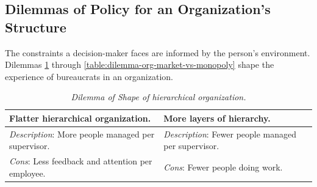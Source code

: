 
\subsection*{Dilemmas of Policy for an Organization's Structure\label{sec:org-dilemma}}


The constraints a decision-maker faces are informed by the person's environment. Dilemmas \ref{table:dilemma-org-people-per-supervisor} through \ref{table:dilemma-org-market-vs-monopoly} shape the experience of bureaucrats in an organization.

\begin{center}
\begin{table}[H] %
\begin{tabular}{ | m{\dilemmatablewidth}| m{\dilemmatablewidth} | } 
  \hline
  \textbf{Flatter hierarchical organization.} &
  \textbf{More layers of hierarchy.} \\ 
  \hline
  \textit{Description}: More people managed per supervisor. & 
  \textit{Description}: Fewer people managed per supervisor. \\ 
  \hline
  \textit{Cons}: Less feedback and attention per employee. & 
  \textit{Cons}: Fewer people doing work. \\  
  \hline
\end{tabular}
\caption{
\textit{Dilemma of Shape of hierarchical organization.}
}
\label{table:dilemma-org-people-per-supervisor}
\end{table}
\end{center}



